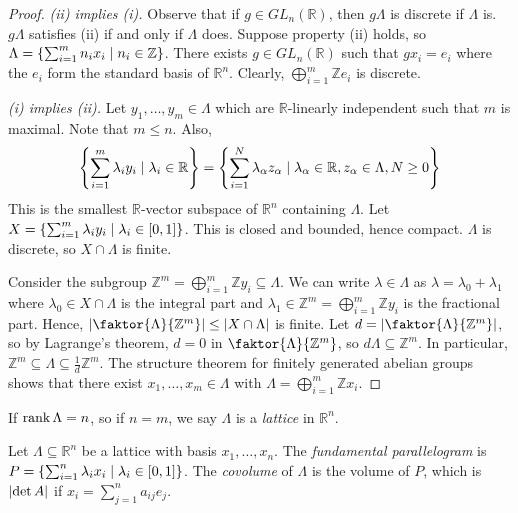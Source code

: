 \begin{proof}
    \emph{(ii) implies (i).}
    Observe that if \( g \in GL_n(\mathbb R) \), then \( g\Lambda \) is discrete if \( \Lambda \) is.
    \( g\Lambda \) satisfies (ii) if and only if \( \Lambda \) does.
    Suppose property (ii) holds, so \( \Lambda = \qty{\sum_{i=1}^m n_i x_i \mid n_i \in \mathbb Z} \).
    There exists \( g \in GL_n(\mathbb R) \) such that \( gx_i = e_i \) where the \( e_i \) form the standard basis of \( \mathbb R^n \).
    Clearly, \( \bigoplus_{i=1}^m \mathbb Z e_i \) is discrete.

    \emph{(i) implies (ii).}
    Let \( y_1, \dots, y_m \in \Lambda \) which are \( \mathbb R \)-linearly independent such that \( m \) is maximal.
    Note that \( m \leq n \).
    Also,
    \[ \qty{\sum_{i=1}^m \lambda_i y_i \mid \lambda_i \in \mathbb R} = \qty{\sum_{i=1}^N \lambda_\alpha z_\alpha \mid \lambda_\alpha \in \mathbb R, z_\alpha \in \Lambda, N \geq 0} \]
    This is the smallest \( \mathbb R \)-vector subspace of \( \mathbb R^n \) containing \( \Lambda \).
    Let \( X = \qty{\sum_{i=1}^m \lambda_i y_i \mid \lambda_i \in [0,1]} \).
    This is closed and bounded, hence compact.
    \( \Lambda \) is discrete, so \( X \cap \Lambda \) is finite.

    Consider the subgroup \( \mathbb Z^m = \bigoplus_{i=1}^m \mathbb Z y_i \subseteq \Lambda \).
    We can write \( \lambda \in \Lambda \) as \( \lambda = \lambda_0 + \lambda_1 \) where \( \lambda_0 \in X \cap \Lambda \) is the integral part and \( \lambda_1 \in \mathbb Z^m = \bigoplus_{i=1}^m \mathbb Z y_i \) is the fractional part.
    Hence, \( \abs{\faktor{\Lambda}{\mathbb Z^m}} \leq \abs{X \cap \Lambda} \) is finite.
    Let \( d = \abs{\faktor{\Lambda}{\mathbb Z^m}} \), so by Lagrange's theorem, \( d = 0 \) in \( \faktor{\Lambda}{\mathbb Z^m} \), so \( d\Lambda \subseteq \mathbb Z^m \).
    In particular, \( \mathbb Z^m \subseteq \Lambda \subseteq \frac{1}{d} \mathbb Z^m \).
    The structure theorem for finitely generated abelian groups shows that there exist \( x_1, \dots, x_m \in \Lambda \) with \( \Lambda = \bigoplus_{i=1}^m \mathbb Z x_i \).
\end{proof}
\begin{definition}
    If \( \rank \Lambda = n \), so if \( n = m \), we say \( \Lambda \) is a \emph{lattice} in \( \mathbb R^n \).
\end{definition}
\begin{definition}
    Let \( \Lambda \subseteq \mathbb R^n \) be a lattice with basis \( x_1, \dots, x_n \).
    The \emph{fundamental parallelogram} is \( P = \qty{\sum_{i=1}^n \lambda_i x_i \mid \lambda_i \in [0,1]} \).
    The \emph{covolume} of \( \Lambda \) is the volume of \( P \), which is \( \abs{\det A} \) if \( x_i = \sum_{j=1}^n a_{ij} e_j \).    
\end{definition}

